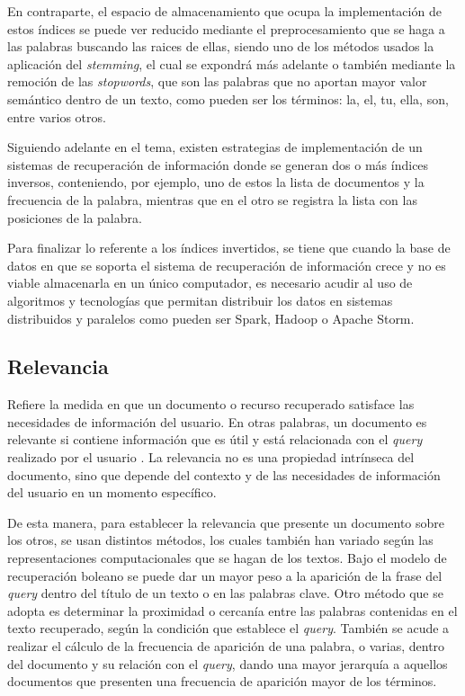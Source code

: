 \documentclass[
  12pt,
  openany]{book}
\begin{document}
En contraparte, el espacio de almacenamiento que ocupa la implementación de estos índices se puede ver reducido mediante el preprocesamiento que se haga a las palabras buscando las raices de ellas, siendo uno de los métodos usados la aplicación del \emph{stemming}, el cual se expondrá más adelante o también mediante la remoción de las \emph{stopwords}, que son las palabras que no aportan mayor valor semántico dentro de un texto, como pueden ser los términos: la, el, tu, ella, son, entre varios otros.

Siguiendo adelante en el tema, existen estrategias de implementación de un sistemas de recuperación de información donde se generan dos o más índices inversos, conteniendo, por ejemplo, uno de estos la lista de documentos y la frecuencia de la palabra, mientras que en el otro se registra la lista con las posiciones de la palabra.

Para finalizar lo referente a los índices invertidos, se tiene que cuando la base de datos en que se soporta el sistema de recuperación de información crece y no es viable almacenarla en un único computador, es necesario acudir al uso de algoritmos y tecnologías que permitan distribuir los datos en sistemas distribuidos y paralelos como pueden ser Spark, Hadoop o Apache Storm.

\hypertarget{relevancia}{%
\subsection{Relevancia}\label{relevancia}}

Refiere la medida en que un documento o recurso recuperado satisface las necesidades de información del usuario. En otras palabras, un documento es relevante si contiene información que es útil y está relacionada con el \emph{query} realizado por el usuario \citep{büttcher2010a}. La relevancia no es una propiedad intrínseca del documento, sino que depende del contexto y de las necesidades de información del usuario en un momento específico.

De esta manera, para establecer la relevancia que presente un documento sobre los otros, se usan distintos métodos, los cuales también han variado según las representaciones computacionales que se hagan de los textos. Bajo el modelo de recuperación boleano se puede dar un mayor peso a la aparición de la frase del \emph{query} dentro del título de un texto o en las palabras clave. Otro método que se adopta es determinar la proximidad o cercanía entre las palabras contenidas en el texto recuperado, según la condición que establece el \emph{query}. También se acude a realizar el cálculo de la frecuencia de aparición de una palabra, o varias, dentro del documento y su relación con el \emph{query}, dando una mayor jerarquía a aquellos documentos que presenten una frecuencia de aparición mayor de los términos.
\end{document}
